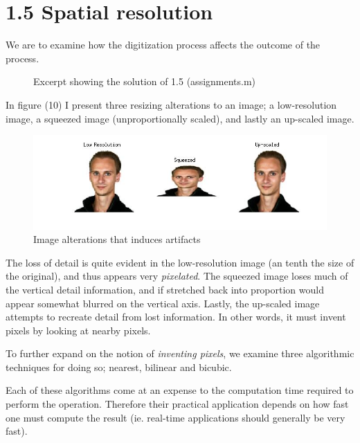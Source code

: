 \documentclass[11pt]{article}
\newcommand{\codefig}[5]
{
\begin{figure}[H]
    
    \caption{#5 (#2)}
    \label{code:#1}
\end{figure}
}
\begin{document}
\section{1.5 \mdseries Spatial resolution}
\label{sec:1-5}
We are to examine how the digitization process affects the outcome of the
process.

\codefig{1-5}{assignments.m}{53}{73}{Excerpt showing the solution of 1.5}

In figure (10) I present three resizing alterations to an image; a
low-resolution image, a squeezed image (unproportionally scaled), and lastly
an up-scaled image.

\begin{figure}[H]
    \hspace{-3.5cm}\includegraphics[scale=0.9]{figures/1-5_1.jpg}
    \caption{Image alterations that induces artifacts}
\end{figure}

The loss of detail is quite evident in the low-resolution image (an tenth the
size of the original), and thus appears very {\it pixelated}. The squeezed
image loses much of the vertical detail information, and if stretched back
into proportion would appear somewhat blurred on the vertical axis. Lastly,
the up-scaled image attempts to recreate detail from lost information. In
other words, it must invent pixels by looking at nearby pixels.

To further expand on the notion of {\it inventing pixels}, we examine three
algorithmic techniques for doing so; nearest, bilinear and bicubic.

Each of these algorithms come at an expense to the computation time required
to perform the operation. Therefore their practical application depends on how
fast one must compute the result (ie. real-time applications should generally
be very fast).
\end{document}

